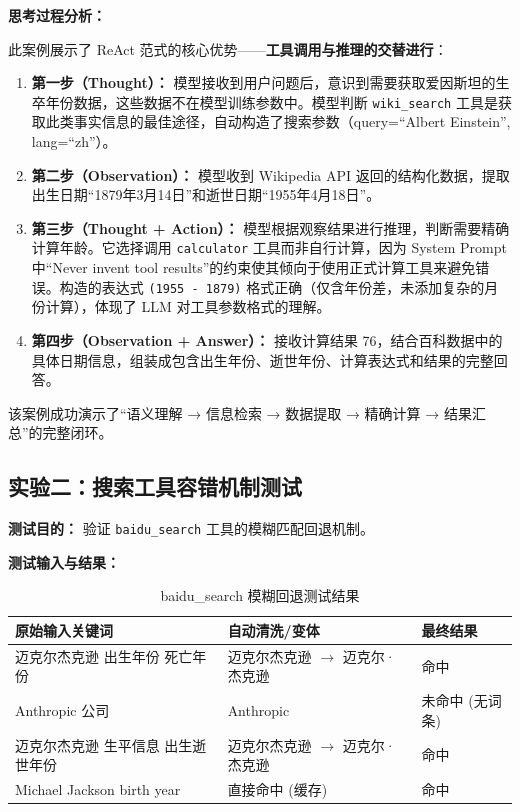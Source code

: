 \documentclass[12pt,a4paper]{ctexart}
\begin{document}
\textbf{思考过程分析：}

此案例展示了 ReAct 范式的核心优势——\textbf{工具调用与推理的交替进行}：

\begin{enumerate}
  \item \textbf{第一步（Thought）：}
    模型接收到用户问题后，意识到需要获取爱因斯坦的生卒年份数据，这些数据不在模型训练参数中。模型判断
    \texttt{wiki\_search}
    工具是获取此类事实信息的最佳途径，自动构造了搜索参数（query=``Albert Einstein'',
    lang=``zh''）。

  \item \textbf{第二步（Observation）：} 模型收到 Wikipedia API
    返回的结构化数据，提取出生日期``1879年3月14日''和逝世日期``1955年4月18日''。

  \item \textbf{第三步（Thought + Action）：}
    模型根据观察结果进行推理，判断需要精确计算年龄。它选择调用 \texttt{calculator}
    工具而非自行计算，因为 System Prompt 中``Never invent tool
    results''的约束使其倾向于使用正式计算工具来避免错误。构造的表达式 \texttt{(1955 -
    1879)} 格式正确（仅含年份差，未添加复杂的月份计算），体现了 LLM 对工具参数格式的理解。

  \item \textbf{第四步（Observation + Answer）：} 接收计算结果
    76，结合百科数据中的具体日期信息，组装成包含出生年份、逝世年份、计算表达式和结果的完整回答。
\end{enumerate}

该案例成功演示了``{语义理解} → {信息检索} → {数据提取} → {精确计算} → {结果汇总}''的完整闭环。

\subsection{实验二：搜索工具容错机制测试}

\textbf{测试目的：} 验证 \texttt{baidu\_search} 工具的模糊匹配回退机制。

\textbf{测试输入与结果：}

\begin{table}[H]
  \centering
  \caption{baidu\_search 模糊回退测试结果}
  \begin{tabular}{@{}lll@{}}
    \toprule
    \textbf{原始输入关键词} & \textbf{自动清洗/变体} & \textbf{最终结果} \\
    \midrule
    迈克尔杰克逊 出生年份 死亡年份 & 迈克尔杰克逊 $\to$ 迈克尔·杰克逊 & 命中 \\
    Anthropic 公司 & Anthropic & 未命中 (无词条) \\
    迈克尔杰克逊 生平信息 出生逝世年份 & 迈克尔杰克逊 $\to$ 迈克尔·杰克逊 & 命中 \\
    Michael Jackson birth year & 直接命中 (缓存) & 命中 \\
    \bottomrule
  \end{tabular}
\end{table}
\end{document}
